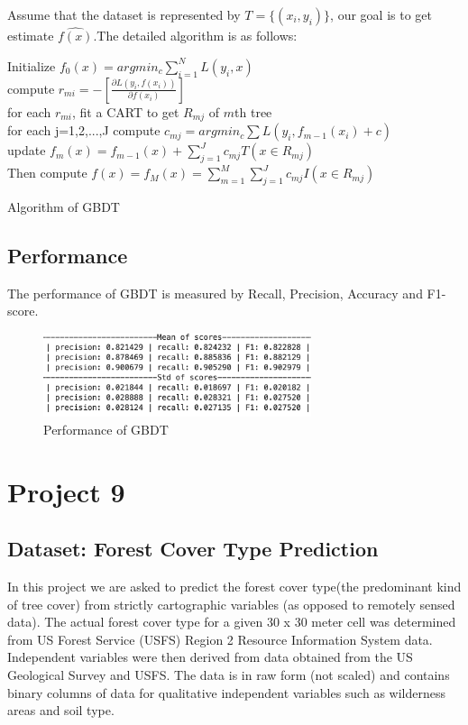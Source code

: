 \documentclass[11pt,en]{elegantpaper}
\begin{document}
Assume that the dataset is represented by $T=\{(x_i, y_i)\}$, our goal is to get estimate $\hat{f(x)}$.The detailed algorithm is as follows:

\begin{algorithm}[H]
\SetAlgoLined
{}
Initialize $f_0(x) = argmin_c \sum_{i=1}^N L(y_i, x)$\\
{
  	{
	compute $r_{mi} = -[\frac{\partial L(y_i, f(x_i))}{\partial f(x_i)}]$\\
	for each $r_{mi}$, fit a CART to get $R_{mj}$ of $m$th tree\\
	for each j=1,2,...,J compute $c_{mj} = argmin_c \sum L(y_i, f_{m-1}(x_i)+c)$\\
	update $f_m(x) = f_{m-1}(x) + \sum_{j=1}^J c_{mj}T(x \in R_{mj})$\\
	}
  Then compute $\hat{f(x)} = f_M(x) = \sum_{m=1}^M \sum_{j=1}^J c_{mj}I (x \in R_{mj})$
}
\caption{Algorithm of GBDT}
\end{algorithm}

\subsection*{Performance}
The performance of GBDT is measured by Recall, Precision, Accuracy and F1-score.

\begin{figure}[H]
	\centering
	\includegraphics[width=0.7\textwidth]{image/gbdt_perf.png}
	\caption{Performance of GBDT}
	\label{gbdt1_performance}
\end{figure}

\section{Project 9}
\subsection{Dataset: Forest Cover Type Prediction}
In this project we are asked to predict the forest cover type(the predominant kind of tree cover) from strictly cartographic variables (as opposed to remotely sensed data). The actual forest cover type for a given 30 x 30 meter cell was determined from US Forest Service (USFS) Region 2 Resource Information System data. Independent variables were then derived from data obtained from the US Geological Survey and USFS. The data is in raw form (not scaled) and contains binary columns of data for qualitative independent variables such as wilderness areas and soil type.
\end{document}
